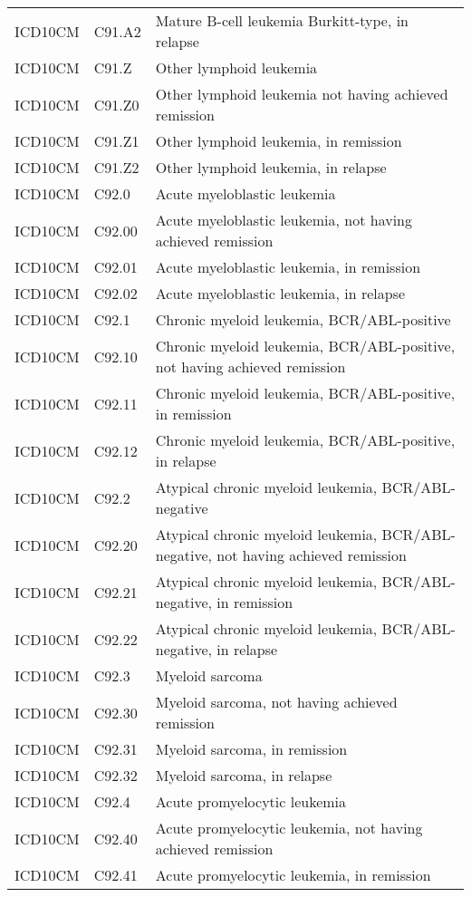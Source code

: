 \begin{longtable}{p{}p{}p{}}
  ICD10CM & C91.A2 & Mature B-cell leukemia Burkitt-type, in relapse \\ 
  ICD10CM & C91.Z & Other lymphoid leukemia \\ 
  ICD10CM & C91.Z0 & Other lymphoid leukemia not having achieved remission \\ 
  ICD10CM & C91.Z1 & Other lymphoid leukemia, in remission \\ 
  ICD10CM & C91.Z2 & Other lymphoid leukemia, in relapse \\ 
  ICD10CM & C92.0 & Acute myeloblastic leukemia \\ 
  ICD10CM & C92.00 & Acute myeloblastic leukemia, not having achieved remission \\ 
  ICD10CM & C92.01 & Acute myeloblastic leukemia, in remission \\ 
  ICD10CM & C92.02 & Acute myeloblastic leukemia, in relapse \\ 
  ICD10CM & C92.1 & Chronic myeloid leukemia, BCR/ABL-positive \\ 
  ICD10CM & C92.10 & Chronic myeloid leukemia, BCR/ABL-positive, not having achieved remission \\ 
  ICD10CM & C92.11 & Chronic myeloid leukemia, BCR/ABL-positive, in remission \\ 
  ICD10CM & C92.12 & Chronic myeloid leukemia, BCR/ABL-positive, in relapse \\ 
  ICD10CM & C92.2 & Atypical chronic myeloid leukemia, BCR/ABL-negative \\ 
  ICD10CM & C92.20 & Atypical chronic myeloid leukemia, BCR/ABL-negative, not having achieved remission \\ 
  ICD10CM & C92.21 & Atypical chronic myeloid leukemia, BCR/ABL-negative, in remission \\ 
  ICD10CM & C92.22 & Atypical chronic myeloid leukemia, BCR/ABL-negative, in relapse \\ 
  ICD10CM & C92.3 & Myeloid sarcoma \\ 
  ICD10CM & C92.30 & Myeloid sarcoma, not having achieved remission \\ 
  ICD10CM & C92.31 & Myeloid sarcoma, in remission \\ 
  ICD10CM & C92.32 & Myeloid sarcoma, in relapse \\ 
  ICD10CM & C92.4 & Acute promyelocytic leukemia \\ 
  ICD10CM & C92.40 & Acute promyelocytic leukemia, not having achieved remission \\ 
  ICD10CM & C92.41 & Acute promyelocytic leukemia, in remission \\ 

\end{longtable}
